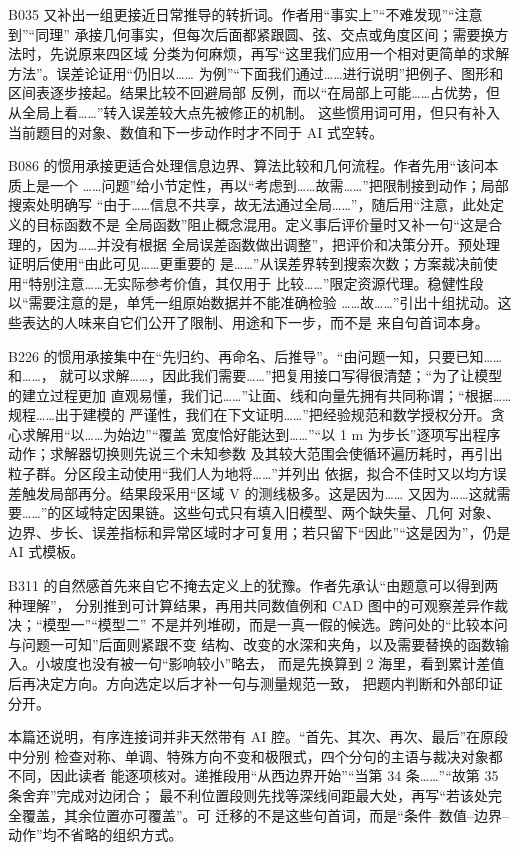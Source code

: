 \documentclass[UTF8,a4paper,12pt]{ctexart}
\begin{document}
B035 又补出一组更接近日常推导的转折词。作者用“事实上”“不难发现”“注意到”“同理”
承接几何事实，但每次后面都紧跟圆、弦、交点或角度区间；需要换方法时，先说原来四区域
分类为何麻烦，再写“这里我们应用一个相对更简单的求解方法”。误差论证用“仍旧以……
为例”“下面我们通过……进行说明”把例子、图形和区间表逐步接起。结果比较不回避局部
反例，而以“在局部上可能……占优势，但从全局上看……”转入误差较大点先被修正的机制。
这些惯用词可用，但只有补入当前题目的对象、数值和下一步动作时才不同于 AI 式空转。

B086 的惯用承接更适合处理信息边界、算法比较和几何流程。作者先用“该问本质上是一个
……问题”给小节定性，再以“考虑到……故需……”把限制接到动作；局部搜索处明确写
“由于……信息不共享，故无法通过全局……”，随后用“注意，此处定义的目标函数不是
全局函数”阻止概念混用。定义事后评价量时又补一句“这是合理的，因为……并没有根据
全局误差函数做出调整”，把评价和决策分开。预处理证明后使用“由此可见……更重要的
是……”从误差界转到搜索次数；方案裁决前使用“特别注意……无实际参考价值，其仅用于
比较……”限定资源代理。稳健性段以“需要注意的是，单凭一组原始数据并不能准确检验
……故……”引出十组扰动。这些表达的人味来自它们公开了限制、用途和下一步，而不是
来自句首词本身。

B226 的惯用承接集中在“先归约、再命名、后推导”。“由问题一知，只要已知……和……，
就可以求解……，因此我们需要……”把复用接口写得很清楚；“为了让模型的建立过程更加
直观易懂，我们记……”让面、线和向量先拥有共同称谓；“根据……规程……出于建模的
严谨性，我们在下文证明……”把经验规范和数学授权分开。贪心求解用“以……为始边”“覆盖
宽度恰好能达到……”“以 1 m 为步长”逐项写出程序动作；求解器切换则先说三个未知参数
及其较大范围会使循环遍历耗时，再引出粒子群。分区段主动使用“我们人为地将……”并列出
依据，拟合不佳时又以均方误差触发局部再分。结果段采用“区域 V 的测线极多。这是因为……
又因为……这就需要……”的区域特定因果链。这些句式只有填入旧模型、两个缺失量、几何
对象、边界、步长、误差指标和异常区域时才可复用；若只留下“因此”“这是因为”，仍是 AI
式模板。

B311 的自然感首先来自它不掩去定义上的犹豫。作者先承认“由题意可以得到两种理解”，
分别推到可计算结果，再用共同数值例和 CAD 图中的可观察差异作裁决；“模型一”“模型二”
不是并列堆砌，而是一真一假的候选。跨问处的“比较本问与问题一可知”后面则紧跟不变
结构、改变的水深和夹角，以及需要替换的函数输入。小坡度也没有被一句“影响较小”略去，
而是先换算到 2 海里，看到累计差值后再决定方向。方向选定以后才补一句与测量规范一致，
把题内判断和外部印证分开。

本篇还说明，有序连接词并非天然带有 AI 腔。“首先、其次、再次、最后”在原段中分别
检查对称、单调、特殊方向不变和极限式，四个分句的主语与裁决对象都不同，因此读者
能逐项核对。递推段用“从西边界开始”“当第 34 条……”“故第 35 条舍弃”完成对边闭合；
最不利位置段则先找等深线间距最大处，再写“若该处完全覆盖，其余位置亦可覆盖”。可
迁移的不是这些句首词，而是“条件--数值--边界--动作”均不省略的组织方式。
\end{document}
